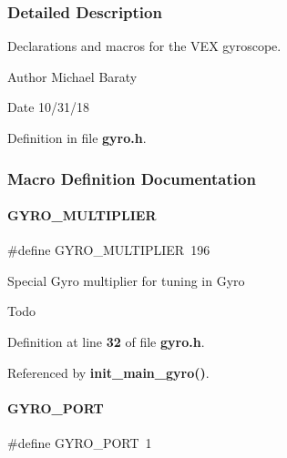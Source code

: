 \subsubsection{Detailed Description}
Declarations and macros for the V\+EX gyroscope. 

\begin{DoxyAuthor}{Author}
Michael Baraty 
\end{DoxyAuthor}
\begin{DoxyDate}{Date}
10/31/18 
\end{DoxyDate}


Definition in file \textbf{ gyro.\+h}.



\subsubsection{Macro Definition Documentation}
\mbox{\label{gyro_8h_a482017cc25be9213fef3222112eb1c7f}} 
\paragraph{G\+Y\+R\+O\+\_\+\+M\+U\+L\+T\+I\+P\+L\+I\+ER}
{\footnotesize\ttfamily \#define G\+Y\+R\+O\+\_\+\+M\+U\+L\+T\+I\+P\+L\+I\+ER~196}

Special Gyro multiplier for tuning in Gyro \begin{DoxyRefDesc}{Todo}
\item[\textbf{ Todo}]\end{DoxyRefDesc}


Definition at line \textbf{ 32} of file \textbf{ gyro.\+h}.



Referenced by \textbf{ init\+\_\+main\+\_\+gyro()}.

\mbox{\label{gyro_8h_a51d281e7676749d34aab3f8ba6fab960}} 
\paragraph{G\+Y\+R\+O\+\_\+\+P\+O\+RT}
{\footnotesize\ttfamily \#define G\+Y\+R\+O\+\_\+\+P\+O\+RT~1}



